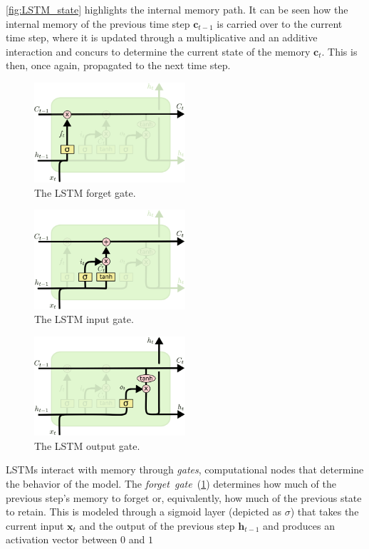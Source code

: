 \ref{fig:LSTM_state} highlights the internal memory path. It can be seen how the internal memory of the previous time step $\mathbf{c}_{t-1}$ is carried over to the current time step, where it is updated through a multiplicative and an additive interaction and concurs to determine the current state of the memory $\mathbf{c}_t$. This is then, once again, propagated to the next time step.


\begin{figure}[p]
	\centering
	\includegraphics[width=0.5\textwidth]{figures/LSTM_forget_gate.pdf}
	\caption{The LSTM forget gate.\label{fig:LSTM_forget_gate}}
\end{figure}
\begin{figure}[p]
	\centering
	\includegraphics[width=0.5\textwidth]{figures/LSTM_input_gate.pdf}
	\caption{The LSTM input gate.\label{fig:LSTM_input_gate}}
\end{figure}
\begin{figure}[p]
	\centering
	\includegraphics[width=0.5\textwidth]{figures/LSTM_output_gate.pdf}
	\caption{The LSTM output gate.\label{fig:LSTM_output_gate}}
\end{figure}

LSTMs interact with memory through \emph{gates}, computational nodes that determine the behavior of the model. The \emph{forget~gate}~(\ref{fig:LSTM_forget_gate}) determines how much of the previous step's memory to forget or, equivalently, how much of the previous state to retain.  This is modeled through a sigmoid layer (depicted as $\sigma$) that takes the current input $\mathbf{x}_t$ and the output of the previous step $\mathbf{h}_{t-1}$ and produces an activation vector between $0$ and $1$

